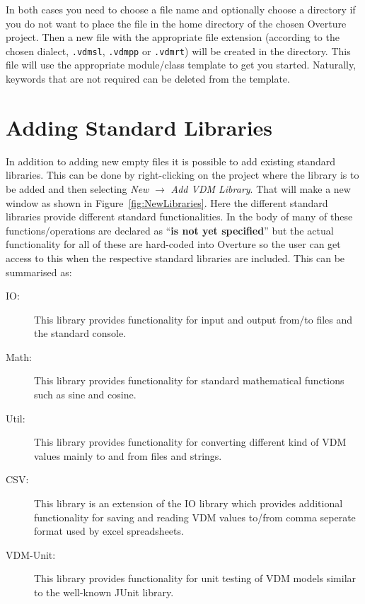 \documentclass{overturerepchap}
\begin{document}
In both cases you need to choose a file name and optionally choose a
directory if you do not want to place the file in the home directory of
the chosen Overture project. Then a new file with the appropriate file
extension (according to the chosen dialect, \texttt{.vdmsl},
\texttt{.vdmpp} or \texttt{.vdmrt}) will be
created in the directory. This file will use the appropriate
module/class template to get you started. Naturally, keywords
that are not required can be deleted from the template.

\section{Adding Standard Libraries}

In addition to adding new empty files it is possible to add existing
standard libraries. This can be done by right-clicking on the project
where the library is to be added and then selecting \emph{New} $\rightarrow$
    \emph{Add VDM Library}. That will make a new window as shown in
    Figure~\ref{fig:NewLibraries}. Here the different standard
    libraries provide different standard functionalities. In the body
    of many of these functions/operations are declared as
    ``{\textbf{\ttfamily is not yet specified}}'' but the actual
    functionality for all of these are hard-coded into Overture so the
    user can get access to this when the respective standard libraries
    are included. This can be
    summarised as:

\begin{description}
\item[IO:] This library provides functionality for input and output
  from/to files and the standard console.
\item[Math:] This library provides functionality for standard
  mathematical functions such as sine and cosine.
\item[Util:] This library provides functionality for converting
  different kind of VDM values mainly to and from files and strings.
\item[CSV:] This library is an extension of the IO library which
  provides additional functionality for saving and reading VDM values
  to/from comma seperate format used by excel spreadsheets.
\item[VDM-Unit:] This library provides functionality for unit testing
  of VDM models similar to the well-known JUnit library.
\end{description}
\end{document}
